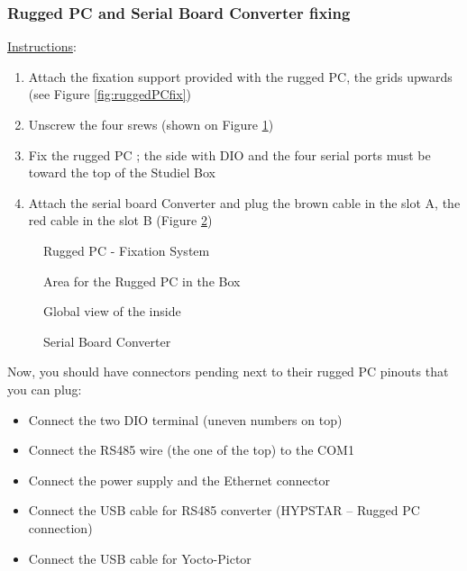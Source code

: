 \clearpage
\subsubsection{Rugged PC and Serial Board Converter fixing}

\underline{Instructions}:
\begin{enumerate}
	\item Attach the fixation support provided with the rugged PC, the grids upwards 
		(see Figure \ref{fig:ruggedPCfix})
	\item Unscrew the four srews (shown on Figure
		\ref{fig:StudielBoxRuggedPCemplacement})
	\item Fix the rugged PC ;  the side with DIO and the four serial ports must
		be toward the top of the Studiel Box
	\item Attach the serial board Converter and plug the brown cable in the
		slot A, the red cable in the slot B (Figure \ref{fig:serialBoard})
\end{enumerate}

\begin{figure}[!ht]
  \centering
  \begin{minipage}[b]{0.49\textwidth}
	  \caption{Rugged PC - Fixation System}
	\label{fig:ruggedPCfix}
  \end{minipage}
  \hfill
  \begin{minipage}[b]{0.49\textwidth}
	  \caption{Area for the Rugged PC in the Box}
	\label{fig:StudielBoxRuggedPCemplacement}
  \end{minipage}
\end{figure}


\begin{figure}[!ht]
  \centering
  \begin{minipage}[b]{0.75\textwidth}
	  \vspace{-20pt}
	  \caption{Global view of the inside}
	\label{label}
  \end{minipage}
  \hfill
  \begin{minipage}[b]{0.24\textwidth}
	  \caption{Serial Board Converter}
	\label{fig:serialBoard}
  \end{minipage}
\end{figure}

\noindent Now, you should have connectors pending next to their rugged PC pinouts that 
you can plug:
\begin{itemize}
	\item Connect the two DIO terminal (uneven numbers on top)
	\item Connect the RS485 wire (the one of the top) to the COM1
	\item Connect the power supply and the Ethernet connector
	\item Connect the USB cable for RS485 converter (HYPSTAR – Rugged PC connection)
	\item Connect the USB cable for Yocto-Pictor 
\end{itemize}

